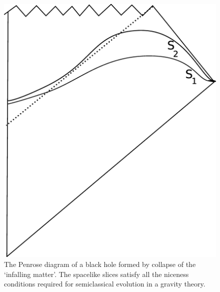 \documentclass[11pt]{article}
\begin{document}
\begin{figure}[htbp]
\begin{center}
\includegraphics[scale=.18]{fthree.eps}
\caption{{The Penrose diagram of a black hole formed by collapse of the `infalling matter'. The spacelike slices satisfy all the niceness conditions required for semiclassical evolution in a gravity theory.}}
\label{fthree}
\end{center}
\end{figure}
\end{document}
